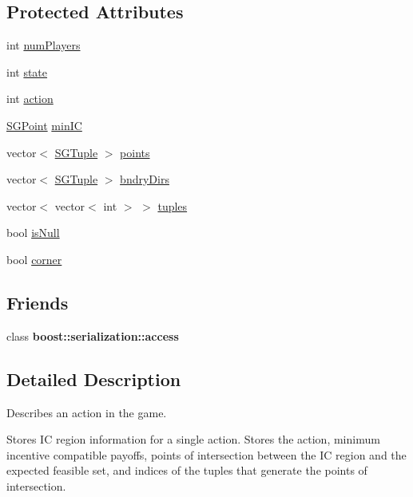 \subsection*{Protected Attributes}
\begin{DoxyCompactItemize}
\item 
int \hyperlink{classSGBaseAction_a88066434fc68234175141e4bc19b1648}{num\+Players}
\item 
int \hyperlink{classSGBaseAction_a2301bf142f93f7d3ddedd44676d10c6a}{state}
\item 
int \hyperlink{classSGBaseAction_af293adc10da2dbb5a388a2fbcca0c67c}{action}
\item 
\hyperlink{classSGPoint}{S\+G\+Point} \hyperlink{classSGBaseAction_ae3bddc2bb5c5e108ead399e66f817b9b}{min\+IC}
\item 
vector$<$ \hyperlink{classSGTuple}{S\+G\+Tuple} $>$ \hyperlink{classSGBaseAction_a4d200e71f5bcfad3fe039293e90dbd70}{points}
\item 
vector$<$ \hyperlink{classSGTuple}{S\+G\+Tuple} $>$ \hyperlink{classSGBaseAction_a8854ab6cd8ad6d197b4647d60f093703}{bndry\+Dirs}
\item 
vector$<$ vector$<$ int $>$ $>$ \hyperlink{classSGBaseAction_a0cc43472c6c4cf598209d1e36eb28545}{tuples}
\item 
bool \hyperlink{classSGBaseAction_ad960a4cc7478182c36f9ebc534496150}{is\+Null}
\item 
bool \hyperlink{classSGBaseAction_a6b0251110d3c13dea965add5446bca40}{corner}
\end{DoxyCompactItemize}
\subsection*{Friends}
\begin{DoxyCompactItemize}
\item 
\mbox{\label{classSGBaseAction_ac98d07dd8f7b70e16ccb9a01abf56b9c}} 
class {\bfseries boost\+::serialization\+::access}
\end{DoxyCompactItemize}


\subsection{Detailed Description}
Describes an action in the game. 

Stores IC region information for a single action. Stores the action, minimum incentive compatible payoffs, points of intersection between the IC region and the expected feasible set, and indices of the tuples that generate the points of intersection. 

